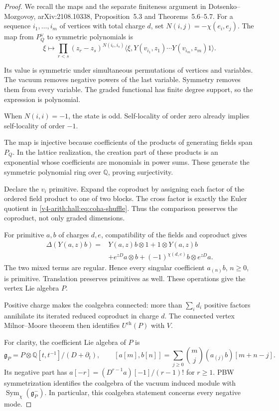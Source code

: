 \begin{proof}
We recall the maps and the separate finiteness argument in
Dotsenko--Mozgovoy, arXiv:2108.10338, Proposition~5.3 and
Theorems~5.6--5.7. For a sequence $i_1,\ldots,i_m$ of vertices
with total charge $d$, set $N(i,j)=-\chi(e_i,e_j)$. The map
from $P_Q^\vee$ to symmetric polynomials is
\[
 \xi\longmapsto
 \prod_{r<s}(z_r-z_s)^{N(i_r,i_s)}
 \bigl\langle\xi,Y(v_{i_1},z_1)\cdots
                         Y(v_{i_m},z_m)1\bigr\rangle.
\]


Its value is symmetric under simultaneous permutations of vertices
and variables. The vacuum removes negative powers of the last variable. Symmetry
removes them from every variable. The graded functional has finite
degree support, so the expression is polynomial.


When $N(i,i)=-1$, the state is odd. Self-locality of order zero
already implies self-locality of order $-1$.

The map is injective because coefficients of the products of
generating fields span $P_Q$. In the lattice realization, the
creation part of these products is an exponential whose coefficients
are monomials in power sums. These generate the symmetric polynomial
ring over $\mathbb Q$, proving surjectivity.


Declare the $v_i$ primitive. Expand the coproduct by assigning each factor of the ordered field
product to one of two blocks. The cross factor is exactly the Euler
quotient in
\eqref{v4-arith:hall:eq:coha-shuffle}. Thus the comparison preserves
the coproduct, not only graded dimensions.

For primitive $a,b$ of charges $d,e$, compatibility of the fields
and coproduct gives
\[
 \begin{split}
 \Delta(Y(a,z)b)={}&Y(a,z)b\otimes1+1\otimes Y(a,z)b\\
 &+e^{zD}a\otimes b+(-1)^{\chi(d,e)}b\otimes e^{zD}a.
 \end{split}
\]
The two mixed terms are regular. Hence every singular coefficient
$a_{(n)}b$, $n\geq0$, is primitive. Translation preserves primitives
as well.
These operations give the vertex Lie algebra $P$.


Positive charge makes the coalgebra connected: more than $\sum_i d_i$
positive factors annihilate its iterated reduced coproduct in charge $d$.
The connected vertex Milnor--Moore theorem then identifies
$U^{\mathrm{ch}}(P)$ with $V$.

For clarity, the coefficient Lie algebra of $P$ is
\[
 \mathfrak g_P=
 P\otimes\mathbb Q[t,t^{-1}]/(D+\partial_t),\qquad
 [a[m],b[n]]=\sum_{j\geq0}\binom mj(a_{(j)}b)[m+n-j].
\]
Its negative part has
$a[-r]=(D^{r-1}a)[-1]/(r-1)!$ for $r\geq1$.
PBW symmetrization identifies the coalgebra of the vacuum induced
module with $\operatorname{Sym}_{\chi}(\mathfrak g_P^-)$.
In particular, this coalgebra statement concerns every negative mode.


\end{proof}
